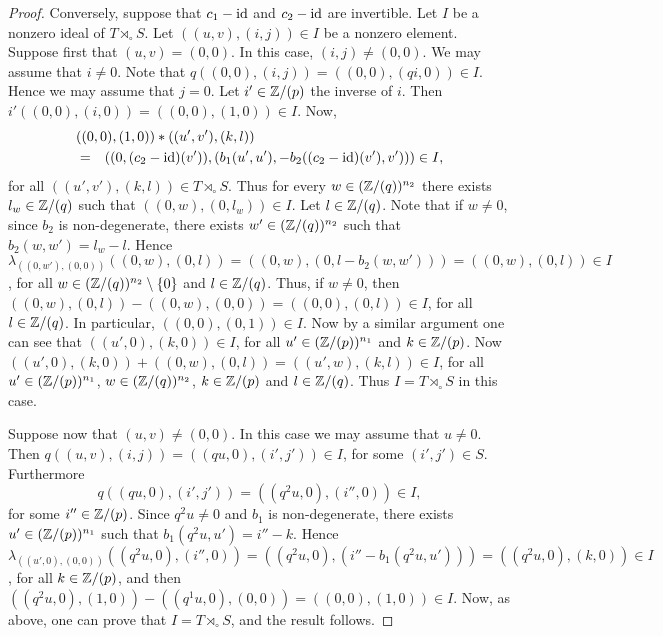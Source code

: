 \begin{proof}
Conversely, suppose that $c_1-\operatorname{id}$ and $c_2-\operatorname{id}$ are invertible. Let $I$ be a nonzero ideal of $T\rtimes_{\circ}S$.
Let $((u,v),(i,j))\in I$ be a nonzero element. Suppose first that $(u,v)=(0,0)$. In this case, $(i,j)\neq (0,0)$. We may assume that $i\neq 0$. Note that $q((0,0),(i,j))=((0,0),(qi,0))\in I$. Hence we may assume that $j=0$. Let $i'\in\mathbb{Z}/(p)$ the inverse of $i$. Then
$i'((0,0),(i,0))=((0,0),(1,0))\in I$. Now,  
\begin{eqnarray*}\lefteqn{((0,0),(1,0))*((u',v'),(k,l))}\\
	&=&((0,(c_2-\id)(v')),(b_1(u',u'),-b_2((c_2-\id)(v'),v')))\in I,
\end{eqnarray*}
for all $((u',v'),(k,l))\in T\rtimes_{\circ}S$. Thus for every $w\in (\mathbb{Z}/(q))^{n_2}$ there exists $l_w\in \mathbb{Z}/(q)$ such that
$((0,w),(0,l_w))\in I$. Let $l\in \mathbb{Z}/(q)$. Note that if $w\neq 0$, since $b_2$ is non-degenerate, 
there exists $w'\in (\mathbb{Z}/(q))^{n_2}$ such that $b_2(w,w')=l_w-l$. Hence $\lambda_{((0,w'),(0,0))}((0,w),(0,l))=((0,w),(0,l-b_2(w,w')))=((0,w),(0,l))\in I$, for all $w\in (\mathbb{Z}/(q))^{n_2}\setminus\{0\}$ and $l\in \mathbb{Z}/(q)$. Thus, if $w\neq 0$, then $((0,w),(0,l))-((0,w),(0,0))=((0,0),(0,l))\in I$, for all $l\in\mathbb{Z}/(q)$. In particular, $((0,0),(0,1))\in I$. Now by a similar argument one can see that $((u',0),(k,0))\in I$, for all $u'\in (\mathbb{Z}/(p))^{n_1}$ and $k\in\mathbb{Z}/(p)$. Now
$((u',0),(k,0))+((0,w),(0,l))=((u',w),(k,l))\in I$, for all $u'\in (\mathbb{Z}/(p))^{n_1}$, $w\in (\mathbb{Z}/(q))^{n_2}$, $k\in\mathbb{Z}/(p)$ and $l\in\mathbb{Z}/(q)$.
Thus $I=T\rtimes_{\circ}S$ in this case. 

Suppose now that $(u,v)\neq (0,0)$. In this case we may assume that $u\neq 0$. Then $q((u,v),(i,j))=((qu,0),(i',j'))\in I$, for some $(i',j')\in S$. Furthermore 
$$q((qu,0),(i',j'))=((q^2u,0),(i'',0))\in I,$$ 
for some $i''\in\mathbb{Z}/(p)$. Since $q^2u\neq 0$ and $b_1$ is non-degenerate, there exists $u'\in (\mathbb{Z}/(p))^{n_1}$ such that $b_1(q^2u,u')=i''-k$. Hence
$\lambda_{((u',0),(0,0))}((q^2u,0),(i'',0))=((q^2u,0),(i''-b_1(q^2u,u')))=((q^2u,0),(k,0))\in I$, for all $k\in\mathbb{Z}/(p)$, and then
$((q^2u,0),(1,0))-((q^1u,0),(0,0))=((0,0),(1,0))\in I$. Now, as above, one can prove that $I=T\rtimes_{\circ}S$, and the result follows.
\end{proof}

